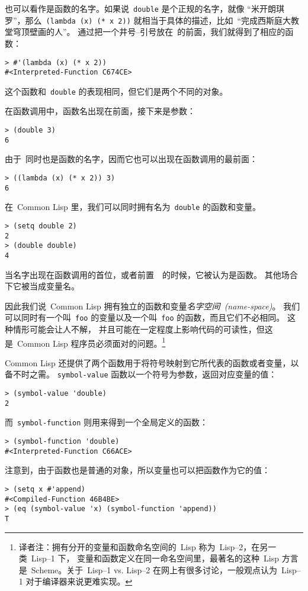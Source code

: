 \lexpr 也可以看作是函数的名字。如果说~\verb|double| 是个正规的名字，就像
``米开朗琪罗''，那么~\verb|(lambda (x) (* x 2))|
就相当于具体的描述，比如~``完成西斯庭大教堂穹顶壁画的人''。
通过把一个井号--引号放在~\lexpr 的前面，我们就得到了相应的函数：
\begin{lstlisting}
> #'(lambda (x) (* x 2))
#<Interpreted-Function C674CE>
\end{lstlisting}
这个函数和~\verb|double| 的表现相同，但它们是两个不同的对象。

在函数调用中，函数名出现在前面，接下来是参数：
\begin{lstlisting}
> (double 3)
6
\end{lstlisting}
由于~\lexpr 同时也是函数的名字，因而它也可以出现在函数调用的最前面：
\begin{lstlisting}
> ((lambda (x) (* x 2)) 3)
6
\end{lstlisting}

在~Common Lisp 里，我们可以同时拥有名为~\verb|double| 的函数和变量。
\begin{lstlisting}
> (setq double 2)
2
> (double double)
4
\end{lstlisting}
当名字出现在函数调用的首位，或者前置~\sq~的时候，它被认为是函数。
其他场合下它被当成变量名。

因此我们说~Common Lisp 拥有独立的函数和变量\emph{名字空间~(name-space)}。
我们可以同时有一个叫~\verb|foo| 的变量以及一个叫~\verb|foo| 的函数，而且它们不必相同。
这种情形可能会让人不解，
并且可能在一定程度上影响代码的可读性，但这是~Common Lisp 程序员必须面对的问题。\footnote{
译者注：拥有分开的变量和函数命名空间的~Lisp 称为~Lisp--2，在另一类~Lisp--1 下，
变量和函数定义在同一命名空间里，最著名的这种~Lisp 方言是~Scheme。关于~Lisp--1 vs.
Lisp--2 在网上有很多讨论，一般观点认为~Lisp--1 对于编译器来说更难实现。}

Common Lisp 还提供了两个函数用于将符号映射到它所代表的函数或者变量，以备不时之需。
\verb|symbol-value| 函数以一个符号为参数，返回对应变量的值：
\begin{lstlisting}
> (symbol-value 'double)
2
\end{lstlisting}
而~\verb|symbol-function|
则用来得到一个全局定义的函数：
\begin{lstlisting}
> (symbol-function 'double)
#<Interpreted-Function C66ACE>
\end{lstlisting}
注意到，由于函数也是普通的对象，所以变量也可以把函数作为它的值：
\begin{lstlisting}
> (setq x #'append)
#<Compiled-Function 46B4BE>
> (eq (symbol-value 'x) (symbol-function 'append))
T
\end{lstlisting}

